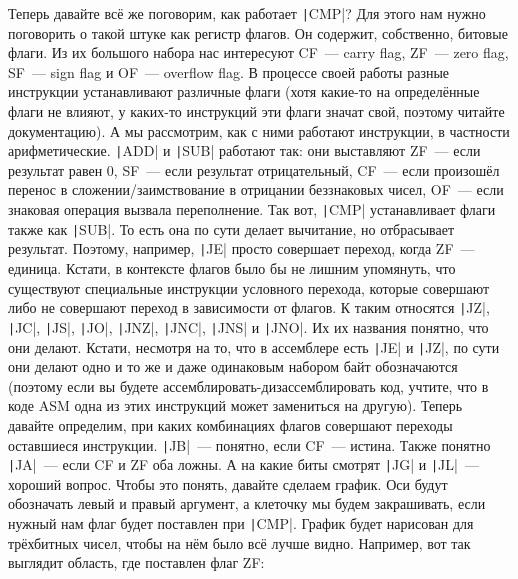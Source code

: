\documentclass{article}
\begin{document}
    Теперь давайте всё же поговорим, как работает \texttt|CMP|? Для этого нам нужно поговорить о такой штуке как регистр флагов. Он содержит, собственно, битовые флаги. Из их большого набора нас интересуют CF~--- carry flag, ZF~--- zero flag, SF~--- sign flag и OF~--- overflow flag. В процессе своей работы разные инструкции устанавливают различные флаги (хотя какие-то на определённые флаги не влияют, у каких-то инструкций эти флаги значат свой, поэтому читайте документацию). А мы рассмотрим, как с ними работают инструкции, в частности арифметические. \texttt|ADD| и \texttt|SUB| работают так: они выставляют ZF~--- если результат равен 0, SF~--- если результат отрицательный, CF~--- если произошёл перенос в сложении/заимствование в отрицании беззнаковых чисел, OF~--- если знаковая операция вызвала переполнение. Так вот, \texttt|CMP| устанавливает флаги также как \texttt|SUB|. То есть она по сути делает вычитание, но отбрасывает результат. Поэтому, например, \texttt|JE| просто совершает переход, когда ZF~--- единица. Кстати, в контексте флагов было бы не лишним упомянуть, что существуют специальные инструкции условного перехода, которые совершают либо не совершают переход в зависимости от флагов. К таким относятся \texttt|JZ|, \texttt|JC|, \texttt|JS|, \texttt|JO|, \texttt|JNZ|, \texttt|JNC|, \texttt|JNS| и \texttt|JNO|. Их их названия понятно, что они делают. Кстати, несмотря на то, что в ассемблере есть \texttt|JE| и \texttt|JZ|, по сути они делают одно и то же и даже одинаковым набором байт обозначаются (поэтому если вы будете ассемблировать-дизассемблировать код, учтите, что в коде ASM одна из этих инструкций может замениться на другую). Теперь давайте определим, при каких комбинациях флагов совершают переходы оставшиеся инструкции. \texttt|JB|~--- понятно, если CF~--- истина. Также понятно \texttt|JA|~--- если CF и ZF оба ложны. А на какие биты смотрят \texttt|JG| и \texttt|JL|~--- хороший вопрос. Чтобы это понять, давайте сделаем график. Оси будут обозначать левый и правый аргумент, а клеточку мы будем закрашивать, если нужный нам флаг будет поставлен при \texttt|CMP|. График будет нарисован для трёхбитных чисел, чтобы на нём было всё лучше видно. Например, вот так выглядит область, где поставлен флаг ZF:
\end{document}
